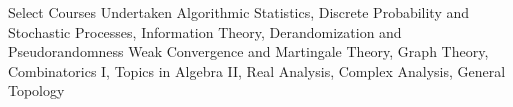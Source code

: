 
\begin{rubric}{Select Courses Undertaken}
		Algorithmic Statistics, Discrete Probability and Stochastic Processes, Information Theory, Derandomization and Pseudorandomness
	\entry*[Mathematics]
		Weak Convergence and Martingale Theory, Graph Theory, Combinatorics I, Topics in Algebra II, Real Analysis, Complex Analysis, General Topology
\end{rubric}
